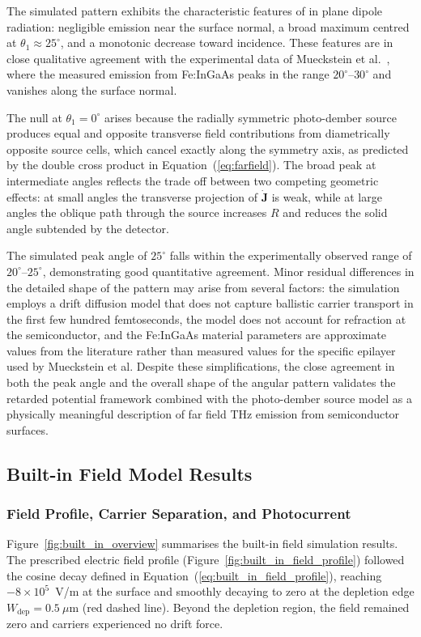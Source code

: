 \documentclass[12pt]{final_project_report}
\begin{document}
The simulated pattern exhibits the characteristic features of in plane dipole radiation: negligible emission near the surface normal, a broad maximum centred at $\theta_1 \approx 25^\circ$, and a monotonic decrease toward incidence. These features are in close qualitative agreement with the experimental data of Mueckstein et al.~\cite{Mueckstein2015}, where the measured emission from Fe:InGaAs peaks in the range $20^\circ$--$30^\circ$ and vanishes along the surface normal.

The null at $\theta_1 = 0^\circ$ arises because the radially symmetric photo-dember source produces equal and opposite transverse field contributions from diametrically opposite source cells, which cancel exactly along the symmetry axis, as predicted by the double cross product in Equation~(\ref{eq:farfield}). The broad peak at intermediate angles reflects the trade off between two competing geometric effects: at small angles the transverse projection of $\dot{\mathbf{J}}$ is weak, while at large angles the oblique path through the source increases $R$ and reduces the solid angle subtended by the detector.

The simulated peak angle of $25^\circ$ falls within the experimentally observed range of $20^\circ$--$25^\circ$, demonstrating good quantitative agreement. Minor residual differences in the detailed shape of the pattern may arise from several factors: the simulation employs a drift diffusion model that does not capture ballistic carrier transport in the first few hundred femtoseconds, the model does not account for refraction at the semiconductor, and the Fe:InGaAs material parameters are approximate values from the literature rather than measured values for the specific epilayer used by Mueckstein et al. Despite these simplifications, the close agreement in both the peak angle and the overall shape of the angular pattern validates the retarded potential framework combined with the photo-dember source model as a physically meaningful description of far field THz emission from semiconductor surfaces.

\subsection{Built-in Field Model Results}
\subsubsection{Field Profile, Carrier Separation, and Photocurrent}

Figure~\ref{fig:built_in_overview} summarises the built-in field simulation results. The prescribed electric field profile (Figure~\ref{fig:built_in_field_profile}) followed the cosine decay defined in Equation~(\ref{eq:built_in_field_profile}), reaching $-8 \times 10^5$~V/m at the surface and smoothly decaying to zero at the depletion edge $W_{\mathrm{dep}} = 0.5~\mu\mathrm{m}$ (red dashed line). Beyond the depletion region, the field remained zero and carriers experienced no drift force.
\end{document}
